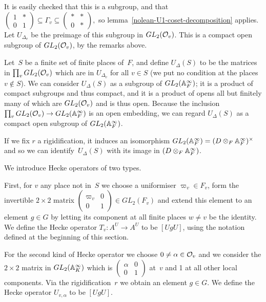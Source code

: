 It is easily checked that this is a subgroup, and that
$\begin{pmatrix}1&*\\0&1\end{pmatrix}\subseteq\Gamma_v\subseteq\begin{pmatrix}*&*\\0&*\end{pmatrix},$
so lemma~\ref{nolean-U1-coset-decomposition} applies.
Let $U_{\Delta_v}$ be the preimage of this subgroup in $GL_2(\mathcal{O}_v)$.
This is a compact open subgroup of $GL_2(\mathcal{O}_v)$, by the remarks above.

Let~$S$ be a finite set of finite places of~$F$, and define $U_\Delta(S)$ to be the matrices
in $\prod_v GL_2(\mathcal{O}_v)$ which are in $U_{\Delta_v}$ for all $v\in S$ (we put no condition
at the places $v\notin S$). We can consider
$U_{\Delta}(S)$ as a subgroup of $GL_2(\mathbb{A}_F^\infty)$; it is a product of compact subgroups
and thus compact, and it is a product of opens all but finitely many of which are $GL_2(\mathcal{O}_v)$
and is thus open. Because the inclusion $\prod_v GL_2(\mathcal{O}_v)\to GL_2(\mathbb{A}_F^\infty)$ is an
open embedding, we can regard $U_\Delta(S)$ as a compact open subgroup of $GL_2(\mathbb{A}_F^\infty)$.

If we fix $r$ a rigidification, it
induces an isomorphism $GL_2(\mathbb{A}_F^\infty)=(D\otimes_F\mathbb{A}_F^\infty)^\times$
and so we can identify~$U_\Delta(S)$ with its image in $(D\otimes_F\mathbb{A}_F^\infty)$.

We introduce Hecke operators of two types.

First, for $v$ any place not in~$S$ we choose a uniformiser $\varpi_v\in F_v$,
form the invertible $2\times 2$ matrix $\begin{pmatrix}\varpi_v&0\\0&1\end{pmatrix}\in GL_2(F_v)$
and extend this element to an element $g\in G$ by letting its component at all finite places
$w\not=v$ be the identity. We define the Hecke operator $T_v:A^U\to A^U$ to be $[UgU]$, using the
notation defined at the beginning of this section.

For the second kind of Hecke operator we choose
$0\not=\alpha\in\mathcal{O}_v$ and we consider the $2\times 2$ matrix in $GL_2(\mathbb{A}_K^\infty)$
which is $\begin{pmatrix}\alpha&0\\0&1\end{pmatrix}$ at~$v$ and 1 at all other local components.
Via the rigidification~$r$ we obtain an element $g\in G$.
We define the Hecke operator $U_{v,\alpha}$ to be $[UgU]$.

